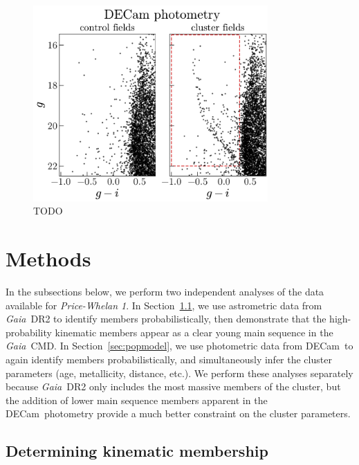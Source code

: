 \documentclass[modern]{aastex62}
\newcommand{\acronym}[1]{{\small{#1}}}
\newcommand{\gaia}{\textsl{Gaia}}
\newcommand{\decam}{DECam}
\newcommand{\DR}[1]{\acronym{DR#1}}
\newcommand{\sectionname}{Section}
\newcommand{\clustername}{\textsl{Price-Whelan 1}}
\begin{document}
\begin{figure}
\centering
\includegraphics[width=0.8\textwidth]{figures/DECam-cmd.pdf}
\caption{TODO}
\label{fig:decam-cmd}
\end{figure}


\section{Methods} \label{sec:methods}

In the subsections below, we perform two independent analyses of the data available for \clustername.
In \sectionname~\ref{sec:pmclean}, we use astrometric data from \gaia\ \DR{2} to identify members probabilistically, then demonstrate that the high-probability kinematic members appear as a clear young main sequence in the \gaia\ CMD.
In \sectionname~\ref{sec:popmodel}, we use photometric data from \decam\ to again identify members probabilistically, and simultaneously infer the cluster parameters (age, metallicity, distance, etc.).
We perform these analyses separately because \gaia\ \DR{2} only includes the most massive members of the cluster, but the addition of lower main sequence members apparent in the \decam\ photometry provide a much better constraint on the cluster parameters.

\subsection{Determining kinematic membership}
\label{sec:pmclean}
\end{document}
